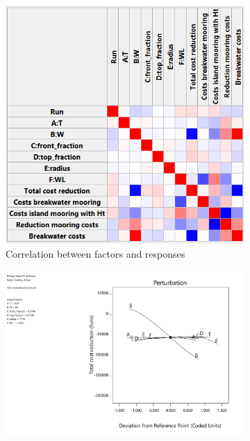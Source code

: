 
\begin{figure}[H]
    \centering
    \begin{subfigure}[b]{0.35\textwidth}
        \centering
        \includegraphics[width=\linewidth]{figures/ComFLOW/Results DI1/costs/correlation_costs.png}
        \caption[]%
        {{\small Correlation between factors and responses}}    
        \label{fig: correlation costs DI1 H3 captive}
    \end{subfigure}
    \hfill
    \begin{subfigure}[b]{0.49\textwidth}  
        \centering 
        \includegraphics[width=\linewidth]{figures/ComFLOW/Results DI1/costs/Perturbation Total cost reduction.pdf}

\end{subfigure}
\end{figure}
